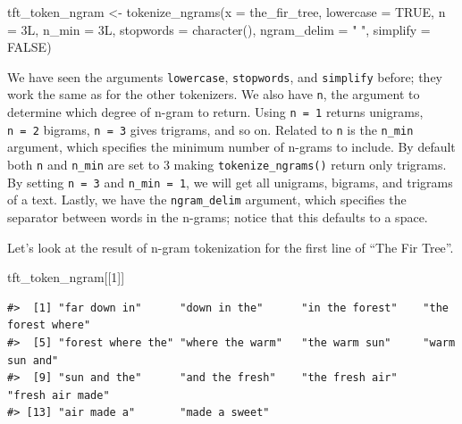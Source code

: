 \documentclass[
]{krantz}
\makeatletter
\newenvironment{Shaded}{\begin{snugshade}}{\end{snugshade}}
\newcommand{\AttributeTok}[1]{\textcolor[rgb]{0.77,0.63,0.00}{#1}}
\newcommand{\ConstantTok}[1]{\textcolor[rgb]{0.00,0.00,0.00}{#1}}
\newcommand{\DecValTok}[1]{\textcolor[rgb]{0.00,0.00,0.81}{#1}}
\newcommand{\FunctionTok}[1]{\textcolor[rgb]{0.00,0.00,0.00}{#1}}
\newcommand{\NormalTok}[1]{#1}
\newcommand{\OtherTok}[1]{\textcolor[rgb]{0.56,0.35,0.01}{#1}}
\newcommand{\StringTok}[1]{\textcolor[rgb]{0.31,0.60,0.02}{#1}}
\newenvironment{kframe}{%
\medskip{}
\setlength{\fboxsep}{.8em}
 \def\at@end@of@kframe{}%
 \ifinner\ifhmode%
  \def\at@end@of@kframe{\end{minipage}}%
  \begin{minipage}{\columnwidth}%
 \fi\fi%
 \def\FrameCommand##1{\hskip\@totalleftmargin \hskip-\fboxsep
 \colorbox{shadecolor}{##1}\hskip-\fboxsep
     \hskip-\linewidth \hskip-\@totalleftmargin \hskip\columnwidth}%
 \MakeFramed {\advance\hsize-\width
   \@totalleftmargin\z@ \linewidth\hsize
   \@setminipage}}%
 {\par\unskip\endMakeFramed%
 \at@end@of@kframe}
\renewenvironment{Shaded}{\begin{kframe}}{\end{kframe}}
\makeatother
\begin{document}
\begin{Shaded}
\begin{Highlighting}[]
\NormalTok{tft\_token\_ngram }\OtherTok{\textless{}{-}} \FunctionTok{tokenize\_ngrams}\NormalTok{(}\AttributeTok{x =}\NormalTok{ the\_fir\_tree,}
                                   \AttributeTok{lowercase =} \ConstantTok{TRUE}\NormalTok{,}
                                   \AttributeTok{n =}\NormalTok{ 3L,}
                                   \AttributeTok{n\_min =}\NormalTok{ 3L,}
                                   \AttributeTok{stopwords =} \FunctionTok{character}\NormalTok{(),}
                                   \AttributeTok{ngram\_delim =} \StringTok{" "}\NormalTok{,}
                                   \AttributeTok{simplify =} \ConstantTok{FALSE}\NormalTok{)}
\end{Highlighting}
\end{Shaded}

We have seen the arguments \texttt{lowercase}, \texttt{stopwords}, and \texttt{simplify} before; they work the same as for the other tokenizers. We also have \texttt{n}, the argument to determine which degree of n-gram to return. Using \texttt{n\ =\ 1} returns unigrams, \texttt{n\ =\ 2} bigrams, \texttt{n\ =\ 3} gives trigrams, and so on. Related to \texttt{n} is the \texttt{n\_min} argument, which specifies the minimum number of n-grams to include. By default both \texttt{n} and \texttt{n\_min} are set to 3 making \texttt{tokenize\_ngrams()} return only trigrams. By setting \texttt{n\ =\ 3} and \texttt{n\_min\ =\ 1}, we will get all unigrams, bigrams, and trigrams of a text. Lastly, we have the \texttt{ngram\_delim} argument, which specifies the separator between words in the n-grams; notice that this defaults to a space.

Let's look at the result of n-gram tokenization for the first line of ``The Fir Tree''.

\begin{Shaded}
\begin{Highlighting}[]
\NormalTok{tft\_token\_ngram[[}\DecValTok{1}\NormalTok{]]}
\end{Highlighting}
\end{Shaded}

\begin{verbatim}
#>  [1] "far down in"      "down in the"      "in the forest"    "the forest where"
#>  [5] "forest where the" "where the warm"   "the warm sun"     "warm sun and"    
#>  [9] "sun and the"      "and the fresh"    "the fresh air"    "fresh air made"  
#> [13] "air made a"       "made a sweet"
\end{verbatim}
\end{document}
